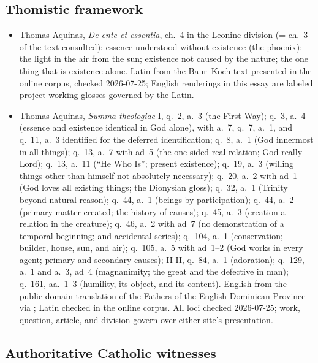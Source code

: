 \subsection*{Thomistic framework}

{\fontsize{8.6}{9.6}\selectfont
\begin{itemize}[itemsep=0pt,parsep=0pt,topsep=0.05em]
\item Thomas Aquinas, \emph{De ente et essentia}, ch.~4 in the Leonine division (= ch.~3 of the text consulted): essence understood without existence (the phoenix); the light in the air from the sun; existence not caused by the nature; the one thing that is existence alone. Latin from the Baur--Koch text presented in the  online corpus, checked 2026-07-25; English renderings in this essay are labeled project working glosses governed by the Latin.
\item Thomas Aquinas, \emph{Summa theologiae} I, q.~2, a.~3 (the First Way); q.~3, a.~4 (essence and existence identical in God alone), with a.~7, q.~7, a.~1, and q.~11, a.~3 identified for the deferred identification; q.~8, a.~1 (God innermost in all things); q.~13, a.~7 with ad~5 (the one-sided real relation; God really Lord); q.~13, a.~11 (``He Who Is''; present existence); q.~19, a.~3 (willing things other than himself not absolutely necessary); q.~20, a.~2 with ad~1 (God loves all existing things; the Dionysian gloss); q.~32, a.~1 (Trinity beyond natural reason); q.~44, a.~1 (beings by participation); q.~44, a.~2 (primary matter created; the history of causes); q.~45, a.~3 (creation a relation in the creature); q.~46, a.~2 with ad~7 (no demonstration of a temporal beginning;  and accidental series); q.~104, a.~1 (conservation; builder, house, sun, and air); q.~105, a.~5 with ad~1--2 (God works in every agent; primary and secondary causes); II-II, q.~84, a.~1 (adoration); q.~129, a.~1 and a.~3, ad~4 (magnanimity; the great and the defective in man); q.~161, aa.~1--3 (humility, its object, and its content). English from the public-domain translation of the Fathers of the English Dominican Province via ; Latin checked in the  online corpus. All loci checked 2026-07-25; work, question, article, and division govern over either site's presentation.
\end{itemize}}

\subsection*{Authoritative Catholic witnesses}

